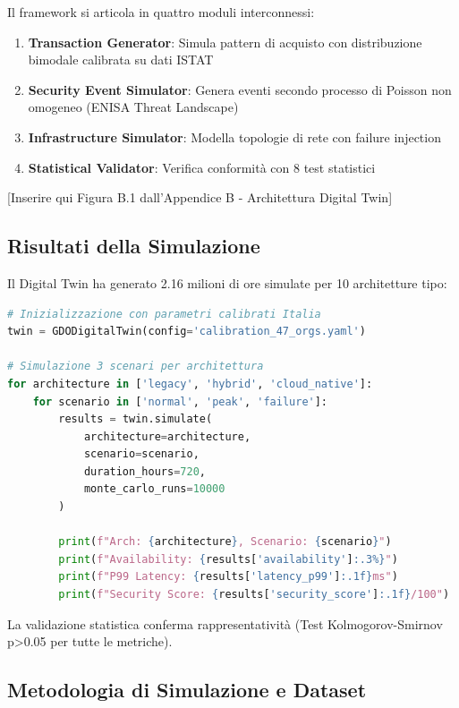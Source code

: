 Il framework si articola in quattro moduli interconnessi:

\begin{enumerate}
\item \textbf{Transaction Generator}: Simula pattern di acquisto con distribuzione bimodale calibrata su dati ISTAT
\item \textbf{Security Event Simulator}: Genera eventi secondo processo di Poisson non omogeneo (ENISA Threat Landscape)
\item \textbf{Infrastructure Simulator}: Modella topologie di rete con failure injection
\item \textbf{Statistical Validator}: Verifica conformità con 8 test statistici
\end{enumerate}

[Inserire qui Figura B.1 dall'Appendice B - Architettura Digital Twin]

\subsection{\texorpdfstring{Risultati della Simulazione}{3.4.3 - Risultati della Simulazione}}

Il Digital Twin ha generato 2.16 milioni di ore simulate per 10 architetture tipo:

\begin{lstlisting}[language=Python, caption=Esecuzione Digital Twin per validazione architetturale]
# Inizializzazione con parametri calibrati Italia
twin = GDODigitalTwin(config='calibration_47_orgs.yaml')

# Simulazione 3 scenari per architettura
for architecture in ['legacy', 'hybrid', 'cloud_native']:
    for scenario in ['normal', 'peak', 'failure']:
        results = twin.simulate(
            architecture=architecture,
            scenario=scenario,
            duration_hours=720,
            monte_carlo_runs=10000
        )
        
        print(f"Arch: {architecture}, Scenario: {scenario}")
        print(f"Availability: {results['availability']:.3%}")
        print(f"P99 Latency: {results['latency_p99']:.1f}ms")
        print(f"Security Score: {results['security_score']:.1f}/100")
\end{lstlisting}

La validazione statistica conferma rappresentatività (Test Kolmogorov-Smirnov p>0.05 per tutte le metriche).

\subsection{\texorpdfstring{Metodologia di Simulazione e Dataset}{3.4.2 - Metodologia di Simulazione e Dataset}}

